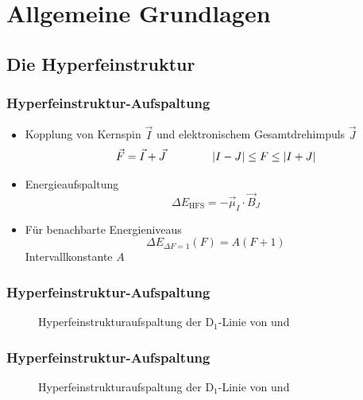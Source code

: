 
\section{Allgemeine Grundlagen}

\subsection{Die Hyperfeinstruktur}

\begin{frame}
\frametitle{Hyperfeinstruktur-Aufspaltung}
\begin{itemize}
    \item<1-> Kopplung von Kernspin $\vec{I}$ und elektronischem Gesamtdrehimpuls $\vec{J}$
    \begin{equation*}
        \vec{F} = \vec{I} + \vec{J} \qquad \qquad \left|I - J\right| \leq F \leq \left|I + J\right|
    \end{equation*}
    \item<2-> Energieaufspaltung
    \begin{equation*}
        \Delta E_\text{HFS} = - \vec{\mu}_I \cdot \vec{B}_J
    \end{equation*}
    \item<3-> Für benachbarte Energieniveaus
    \begin{equation*}
        \Delta E_{\Delta F = 1} (F) = A(F+1)
    \end{equation*}
    Intervallkonstante $A$
\end{itemize}
\end{frame}


\begin{frame}
\frametitle{Hyperfeinstruktur-Aufspaltung}

\begin{figure}
    \centering
    \def\svgwidth{\textwidth}
    
    \caption{Hyperfeinstrukturaufspaltung der D$_1$-Linie von  und }
\end{figure}
\end{frame}


\begin{frame}
\frametitle{Hyperfeinstruktur-Aufspaltung}

\begin{figure}
    \centering
    \def\svgwidth{\textwidth}
    
    \caption{Hyperfeinstrukturaufspaltung der D$_1$-Linie von  und }
\end{figure}



\end{frame}
 


